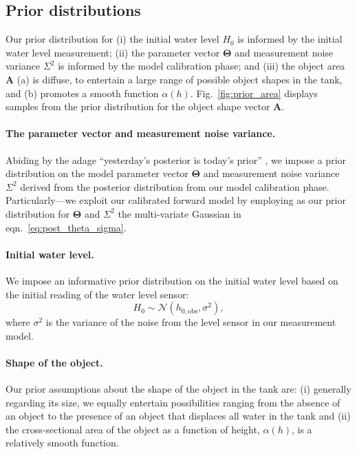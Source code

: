 \documentclass[openacc]{rsproca_new}%
\begin{document}
\subsection{Prior distributions}
Our prior distribution for (i) the initial water level $H_0$ is informed by the initial water level measurement; (ii) the parameter vector $\boldsymbol \Theta$ and measurement noise variance $\Sigma^2$ is informed by the model calibration phase; and (iii) the object area $\mathbf{A}$ (a) is diffuse, to entertain a large range of possible object shapes in the tank, and (b) promotes a smooth function $\alpha(h)$. Fig.~\ref{fig:prior_area} displays samples from the prior distribution for the object shape vector $\mathbf{A}$. 

\vspace{-\baselineskip}
\paragraph{The parameter vector and measurement noise variance.}
Abiding by the adage ``yesterday's posterior is today's prior'' \cite{calvetti2010subjective}, we impose a prior distribution on the model parameter vector $\boldsymbol \Theta$ and measurement noise variance $\Sigma^2$ derived from the posterior distribution from our model calibration phase. 
Particularly---we exploit our calibrated forward model by employing as our prior distribution for $\boldsymbol \Theta$ and $\Sigma^2$ the multi-variate Gaussian in eqn.~\ref{eq:post_theta_sigma}.

\vspace{-\baselineskip}
\paragraph{Initial water level.} We impose an informative prior distribution on the initial water level based on the initial reading of the water level sensor:
\begin{equation}
	H_0 \sim \mathcal{N}(h_{0, \text{obs}}, \sigma^2),
\end{equation} where $\sigma^2$ is the variance of the noise from the level sensor in our measurement model.

\vspace{-\baselineskip}
\paragraph{Shape of the object.}
Our prior assumptions about the shape of the object in the tank are:
(i) generally regarding its size, we equally entertain possibilities ranging from the absence of an object to the presence of an object that displaces all water in the tank and
(ii) the cross-sectional area of the object as a function of height, $\alpha(h)$, is a relatively smooth function.
\end{document}
